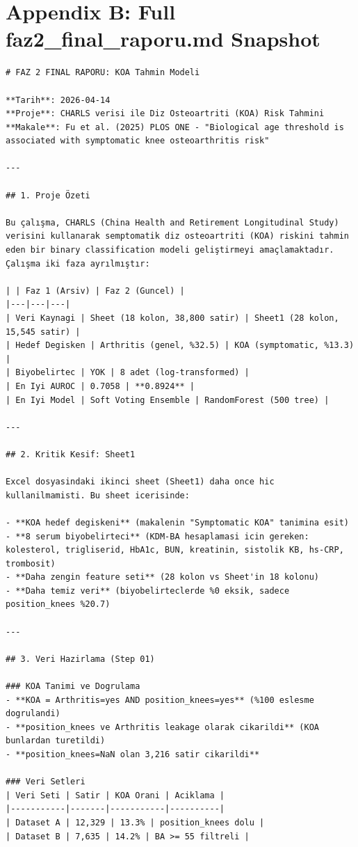 ﻿\documentclass[11pt,a4paper]{article}
\begin{document}
\newpage
\section{Appendix B: Full faz2\_final\_raporu.md Snapshot}

\begin{verbatim}
# FAZ 2 FINAL RAPORU: KOA Tahmin Modeli

**Tarih**: 2026-04-14  
**Proje**: CHARLS verisi ile Diz Osteoartriti (KOA) Risk Tahmini  
**Makale**: Fu et al. (2025) PLOS ONE - "Biological age threshold is associated with symptomatic knee osteoarthritis risk"

---

## 1. Proje Özeti

Bu çalışma, CHARLS (China Health and Retirement Longitudinal Study) verisini kullanarak semptomatik diz osteoartriti (KOA) riskini tahmin eden bir binary classification modeli geliştirmeyi amaçlamaktadır. Çalışma iki faza ayrılmıştır:

| | Faz 1 (Arsiv) | Faz 2 (Guncel) |
|---|---|---|
| Veri Kaynagi | Sheet (18 kolon, 38,800 satir) | Sheet1 (28 kolon, 15,545 satir) |
| Hedef Degisken | Arthritis (genel, %32.5) | KOA (symptomatic, %13.3) |
| Biyobelirtec | YOK | 8 adet (log-transformed) |
| En Iyi AUROC | 0.7058 | **0.8924** |
| En Iyi Model | Soft Voting Ensemble | RandomForest (500 tree) |

---

## 2. Kritik Kesif: Sheet1

Excel dosyasindaki ikinci sheet (Sheet1) daha once hic kullanilmamisti. Bu sheet icerisinde:

- **KOA hedef degiskeni** (makalenin "Symptomatic KOA" tanimina esit)
- **8 serum biyobelirteci** (KDM-BA hesaplamasi icin gereken: kolesterol, trigliserid, HbA1c, BUN, kreatinin, sistolik KB, hs-CRP, trombosit)
- **Daha zengin feature seti** (28 kolon vs Sheet'in 18 kolonu)
- **Daha temiz veri** (biyobelirteclerde %0 eksik, sadece position_knees %20.7)

---

## 3. Veri Hazirlama (Step 01)

### KOA Tanimi ve Dogrulama
- **KOA = Arthritis=yes AND position_knees=yes** (%100 eslesme dogrulandi)
- **position_knees ve Arthritis leakage olarak cikarildi** (KOA bunlardan turetildi)
- **position_knees=NaN olan 3,216 satir cikarildi**

### Veri Setleri
| Veri Seti | Satir | KOA Orani | Aciklama |
|-----------|-------|-----------|----------|
| Dataset A | 12,329 | 13.3% | position_knees dolu |
| Dataset B | 7,635 | 14.2% | BA >= 55 filtreli |


\end{verbatim}
\end{document}
